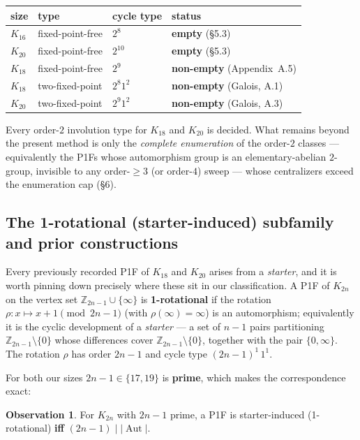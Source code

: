 \documentclass[11pt,reqno]{amsart}
\theoremstyle{plain}
\theoremstyle{definition}
\newtheorem*{observation}{Observation}
\numberwithin{theorem}{section}
\newcommand{\Aut}{\operatorname{Aut}}
\begin{document}
\begin{center}
\begin{tabular}{llll}
\toprule
size & type & cycle type & status \\
\midrule
$K_{16}$ & fixed-point-free & $2^8$    & \textbf{empty} (\S5.3) \\
$K_{20}$ & fixed-point-free & $2^{10}$ & \textbf{empty} (\S5.3) \\
$K_{18}$ & fixed-point-free & $2^9$    & \textbf{non-empty} (Appendix~A.5) \\
$K_{18}$ & two-fixed-point  & $2^8 1^2$ & \textbf{non-empty} (Galois, A.1) \\
$K_{20}$ & two-fixed-point  & $2^9 1^2$ & \textbf{non-empty} (Galois, A.3) \\
\bottomrule
\end{tabular}
\end{center}

Every order-$2$ involution type for $K_{18}$ and $K_{20}$ is decided. What remains beyond
the present method is only the \emph{complete enumeration} of the order-$2$ classes --- equivalently
the P1Fs whose automorphism group is an elementary-abelian $2$-group, invisible to any
order-$\ge3$ (or order-$4$) sweep --- whose centralizers exceed the enumeration cap (\S6).

\subsection{The 1-rotational (starter-induced) subfamily and prior constructions}

Every previously recorded P1F of $K_{18}$ and $K_{20}$ arises from a \emph{starter}, and it is
worth pinning down precisely where these sit in our classification. A P1F of $K_{2n}$ on the
vertex set $\mathbb{Z}_{2n-1}\cup\{\infty\}$ is \textbf{1-rotational} if the rotation
$\rho:x\mapsto x+1\pmod{2n-1}$ (with $\rho(\infty)=\infty$) is an automorphism; equivalently
it is the cyclic development of a \emph{starter} --- a set of $n-1$ pairs partitioning
$\mathbb{Z}_{2n-1}\setminus\{0\}$ whose differences cover $\mathbb{Z}_{2n-1}\setminus\{0\}$,
together with the pair $\{0,\infty\}$. The rotation $\rho$ has order $2n-1$ and cycle type
$(2n-1)^1\,1^1$.

For both our sizes $2n-1\in\{17,19\}$ is \textbf{prime}, which makes the correspondence exact:

\begin{observation}
For $K_{2n}$ with $2n-1$ prime, a P1F is starter-induced (1-rotational)
\textbf{iff} $(2n-1)\mid|\Aut|$.
\end{observation}
\end{document}
